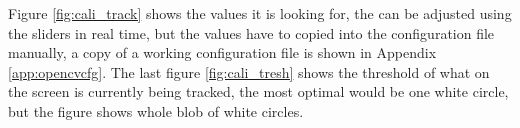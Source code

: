 Figure \ref{fig:cali_track} shows the values it is looking for, the can be adjusted using the sliders in real time, but the values have to copied into the configuration file manually, a copy of a working configuration file is shown in Appendix \ref{app:opencvcfg}. The last figure \ref{fig:cali_tresh} shows the threshold of what on the screen is currently being tracked, the most optimal would be one white circle, but the figure shows whole blob of white circles.
\begin{figure}
    \centering
    \hfill
    \hfill

\end{figure}
